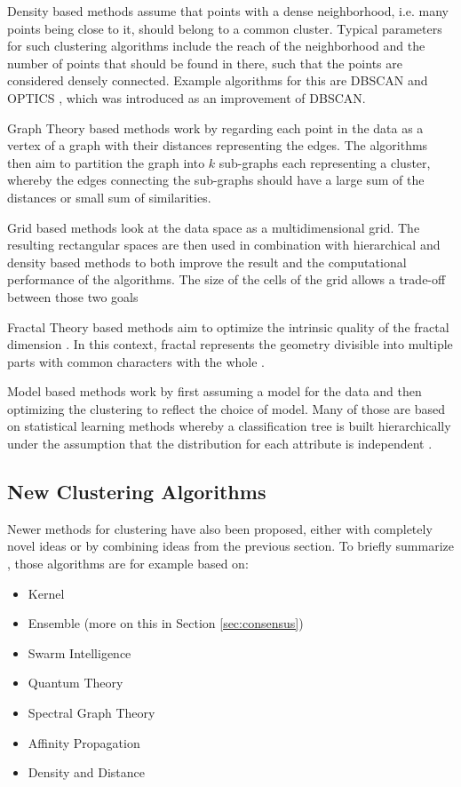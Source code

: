 \documentclass[
	a4paper,
	english,
	twoside,
	openright,               
	11pt                            
	]{report}
\begin{document}
Density based methods assume that points with a dense neighborhood, i.e. many points being close to it, should belong to a common cluster. Typical parameters for such clustering algorithms include the reach of the neighborhood and the number of points that should be found in there, such that the points are considered densely connected. Example algorithms for this are DBSCAN \cite{10.5555/3001460.3001507} and OPTICS \cite{10.1145/304181.304187}, which was introduced as an improvement of DBSCAN.

Graph Theory based methods work by regarding each point in the data as a vertex of a graph with their distances representing the edges. The algorithms then aim to partition the graph into $k$ sub-graphs each representing a cluster, whereby the edges connecting the sub-graphs should have a large sum of the distances or small sum of similarities.

Grid based methods look at the data space as a multidimensional grid. The resulting rectangular spaces are then used in combination with hierarchical and density based methods to both improve the result and the computational performance of the algorithms. The size of the cells of the grid allows a trade-off between those two goals

Fractal Theory based methods aim to optimize the intrinsic quality of the fractal dimension \cite{surveyclustering}. In this context, fractal represents the geometry divisible into multiple parts with common characters with the whole \cite{surveyclustering}.

Model based methods work by first assuming a model for the data and then optimizing the clustering to reflect the choice of model. Many of those are based on statistical learning methods whereby a classification tree is built hierarchically under the assumption that the distribution for each attribute is independent \cite{surveyclustering}.

\subsection{New Clustering Algorithms}

Newer methods for clustering have also been proposed, either with completely novel ideas or by combining ideas from the previous section. To briefly summarize \cite{surveyclustering}, those algorithms are for example based on:

\begin{itemize}
  \item Kernel
  \item Ensemble (more on this in Section \ref{sec:consensus})
  \item Swarm Intelligence
  \item Quantum Theory
  \item Spectral Graph Theory
  \item Affinity Propagation
  \item Density and Distance
\end{itemize}
\end{document}
